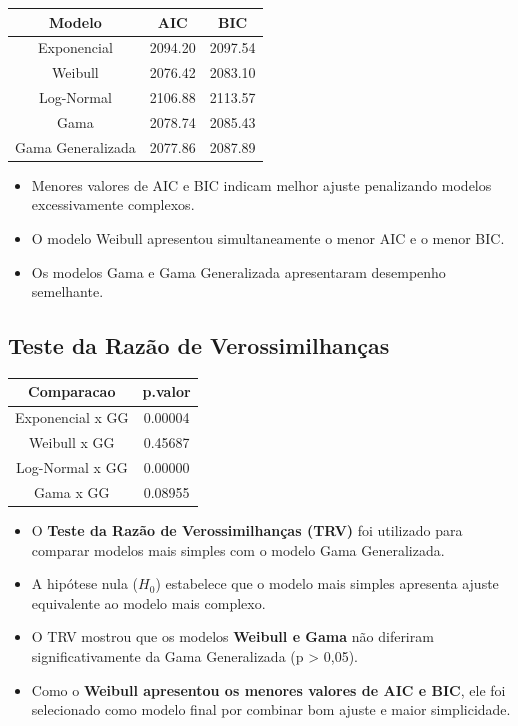 \documentclass[
  brazilian,
  letterpaper,
  DIV=11,
  numbers=noendperiod]{scrartcl}
\newcounter{none} %
\begin{document}
{\def\LTcaptype{none} %
\begin{longtable}[]{@{}ccc@{}}
\toprule\noalign{}
Modelo & AIC & BIC \\
\midrule\noalign{}
\endhead
\bottomrule\noalign{}
\endlastfoot
Exponencial & 2094.20 & 2097.54 \\
Weibull & 2076.42 & 2083.10 \\
Log-Normal & 2106.88 & 2113.57 \\
Gama & 2078.74 & 2085.43 \\
Gama Generalizada & 2077.86 & 2087.89 \\
\end{longtable}
}

\begin{itemize}
\item
  Menores valores de AIC e BIC indicam melhor ajuste penalizando modelos
  excessivamente complexos.
\item
  O modelo Weibull apresentou simultaneamente o menor AIC e o menor BIC.
\item
  Os modelos Gama e Gama Generalizada apresentaram desempenho
  semelhante.
\end{itemize}

\subsection{\texorpdfstring{\textbf{Teste da Razão de
Verossimilhanças}}{Teste da Razão de Verossimilhanças}}\label{teste-da-razuxe3o-de-verossimilhanuxe7as}

{\def\LTcaptype{none} %
\begin{longtable}[]{@{}cc@{}}
\toprule\noalign{}
Comparacao & p.valor \\
\midrule\noalign{}
\endhead
\bottomrule\noalign{}
\endlastfoot
Exponencial x GG & 0.00004 \\
Weibull x GG & 0.45687 \\
Log-Normal x GG & 0.00000 \\
Gama x GG & 0.08955 \\
\end{longtable}
}

\begin{itemize}
\item
  O \textbf{Teste da Razão de Verossimilhanças (TRV)} foi utilizado para
  comparar modelos mais simples com o modelo Gama Generalizada.
\item
  A hipótese nula (\(H_0\)) estabelece que o modelo mais simples
  apresenta ajuste equivalente ao modelo mais complexo.
\item
  O TRV mostrou que os modelos \textbf{Weibull e Gama} não diferiram
  significativamente da Gama Generalizada (p \textgreater{} 0,05).
\item
  Como o \textbf{Weibull apresentou os menores valores de AIC e BIC},
  ele foi selecionado como modelo final por combinar bom ajuste e maior
  simplicidade.
\end{itemize}
\end{document}
